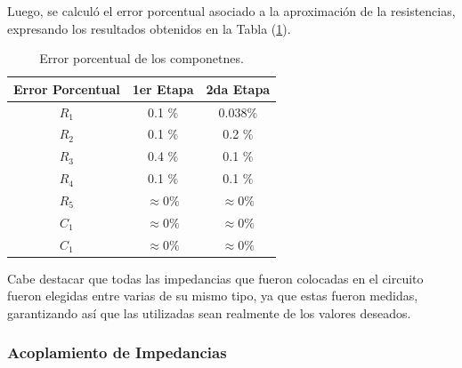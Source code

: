 Luego, se calculó el error porcentual asociado a la aproximación de la resistencias, expresando los resultados obtenidos en la Tabla (\ref{tab:error}).
\begin{table}[H]
\centering
\begin{tabular}{ccc}
\hline
\multicolumn{1}{c}{Error Porcentual} & \multicolumn{1}{c}{1er Etapa} & \multicolumn{1}{c}{2da Etapa} \\ \hline
$R_1$                                & 0.1 $\%$                      & $0.038  \%$                   \\
$R_2$                                & 0.1 $\%$                      & 0.2 $\%$                      \\
$R_3$                                & 0.4 $\%$                      & 0.1 $\%$                      \\
$R_4$                                & 0.1 $\%$                      & 0.1 $\%$                      \\
$R_5$                                & $\approx 0 \%$                & $\approx 0 \%$                \\
$C_1$                                & $\approx 0 \%$                & $\approx 0 \%$                \\
$C_1$                                & $\approx 0 \%$                & $\approx 0 \%$            \\
\hline
\end{tabular}
\caption{Error porcentual de los componetnes.}
\label{tab:error}
\end{table}

Cabe destacar que todas las impedancias que fueron colocadas en el circuito fueron elegidas entre varias de su mismo tipo, ya que estas fueron medidas, garantizando así que las utilizadas sean realmente de los valores deseados.

\subsubsection{Acoplamiento de Impedancias}

